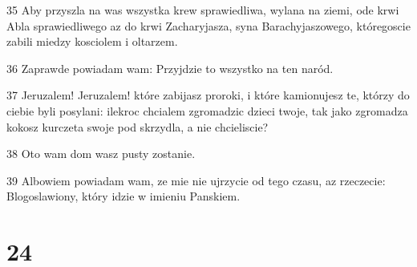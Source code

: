 \par 35 Aby przyszla na was wszystka krew sprawiedliwa, wylana na ziemi, ode krwi Abla sprawiedliwego az do krwi Zacharyjasza, syna Barachyjaszowego, któregoscie zabili miedzy kosciolem i oltarzem.
\par 36 Zaprawde powiadam wam: Przyjdzie to wszystko na ten naród.
\par 37 Jeruzalem! Jeruzalem! które zabijasz proroki, i które kamionujesz te, którzy do ciebie byli posylani: ilekroc chcialem zgromadzic dzieci twoje, tak jako zgromadza kokosz kurczeta swoje pod skrzydla, a nie chcieliscie?
\par 38 Oto wam dom wasz pusty zostanie.
\par 39 Albowiem powiadam wam, ze mie nie ujrzycie od tego czasu, az rzeczecie: Blogoslawiony, który idzie w imieniu Panskiem.

\chapter{24}

